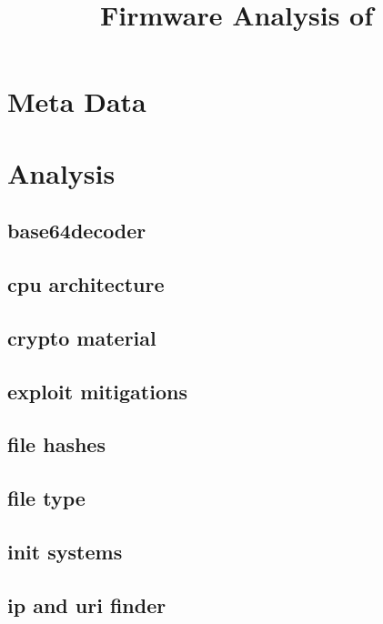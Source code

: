 \documentclass{article}
\begin{document}
\title{Firmware Analysis of }

\maketitle

\section*{Meta Data}


\section*{Analysis}

\subsection*{base64decoder}


\subsection*{cpu architecture}


\subsection*{crypto material}


\subsection*{exploit mitigations}


\subsection*{file hashes}


\subsection*{file type}


\subsection*{init systems}


\subsection*{ip and uri finder}

\end{document}
